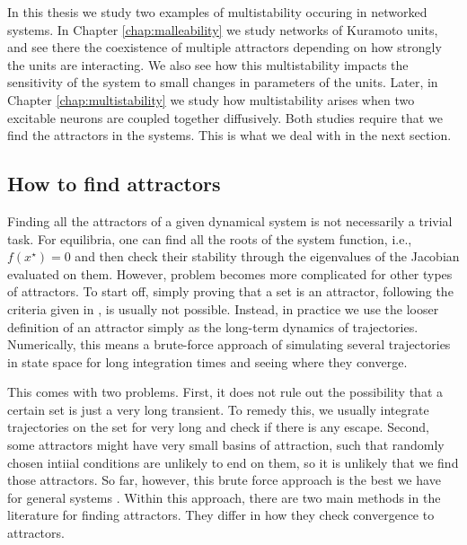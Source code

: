In this thesis we study two examples of multistability occuring in networked systems. In Chapter \ref{chap:malleability} we study networks of Kuramoto units, and see there the coexistence of multiple attractors depending on how strongly the units are interacting. We also see how this multistability impacts the sensitivity of the system to small changes in parameters of the units. Later, in Chapter \ref{chap:multistability} we study how multistability arises when two excitable neurons are coupled together diffusively. Both studies require that we find the attractors in the systems. This is what we deal with in the next section.

\subsection{How to find attractors}
Finding all the attractors of a given dynamical system is not necessarily a trivial task. For equilibria, one can find all the roots of the system function, i.e., $f(x^\star) = 0$ and then check their stability through the eigenvalues of the Jacobian evaluated on them. However, problem becomes more complicated for other types of attractors.
To start off, simply proving that a set is an attractor, following the criteria given in , is usually not possible. Instead, in practice we use the looser definition of an attractor simply as the long-term dynamics of trajectories. Numerically, this means a brute-force approach of simulating several trajectories in state space for long integration times and seeing where they converge.

This comes with two problems. First, it does not rule out the possibility that a certain set is just a very long transient. To remedy this, we usually integrate trajectories on the set for very long and check if there is any escape. Second, some attractors might have very small basins of attraction, such that randomly chosen intiial conditions are unlikely to end on them, so it is unlikely that we find those attractors. So far, however, this brute force approach is the best we have for general systems \cite{}. Within this approach, there are two main methods in the literature for finding attractors. They differ in how they check convergence to attractors.

